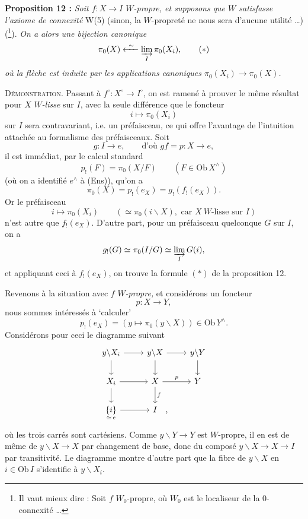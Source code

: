 \documentclass[11pt]{article}
\newcommand{\printedpage}[1]{\marginpar{\footnotesize p.~#1}}
\newcommand{\msp}[1]{\marginpar{\footnotesize [#1]}}
\begin{document}
\textbf{Proposition 12 :} \textit{Soit $f : X \longrightarrow I$ $W$-propre, et supposons que $W$ satisfasse l'axiome de connexité} W(5) (sinon, la $W$-propreté ne nous sera d'aucune utilité \dots) (\footnote[81]{Il vaut mieux dire : Soit $f$ $W_0$-propre, où $W_0$ est le localiseur de la 0-connexité \dots}). \textit{On a alors une bijection canonique}
\[
\pi_0(X) \xleftarrow{\ \sim\ } \varinjlim_{I} \pi_0(X_i), \tag*{$(*)$}
\]
\textit{où la flèche est induite par les applications canoniques $\pi_0(X_i) \longrightarrow \pi_0(X)$.}

\textsc{Démonstration.} Passant à $f^\circ : X^\circ \longrightarrow I^\circ$, on est ramené à prouver le même résultat pour $X$ \textit{$W$-lisse} sur $I$, avec la seule différence que le foncteur
\[
i \longmapsto \pi_0(X_i)
\]
sur $I$ sera contravariant, i.e. un préfaisceau, ce qui offre l'avantage de l'intuition attachée au formalisme des préfaisceaux. Soit
\[
g : I \longrightarrow e, \qquad \text{d'où } gf = p : X \longrightarrow e,
\]
il est immédiat, par le calcul standard
\[
p_!(F) = \pi_0(X/F) \qquad (F \in \mathrm{Ob}\, X^\wedge)
\]
(où on a identifié $e^\wedge$ à (Ens)), qu'on a
\[
\pi_0(X) = p_!(e_X) = g_!(f_!(e_X)).
\]
Or le préfaisceau
\[
i \longmapsto \pi_0(X_i) \qquad (\simeq \pi_0(i\backslash X), \text{ car } X\ W\text{-lisse sur } I)
\]
\msp{page 117}
n'est autre que $f_!(e_X)$. D'autre part, pour un préfaisceau quelconque $G$ sur $I$, on a
\[
g_!(G) \simeq \pi_0(I/G) \simeq \varinjlim_{I} G(i),
\]
et appliquant ceci à $f_!(e_X)$, on trouve la formule $(*)$ de la proposition 12.

Revenons à la situation avec $f$ \textit{$W$-propre,} et considérons un foncteur
\[
p : X \longrightarrow Y,
\]
nous sommes intéressés à ‘calculer’
\[
p_!(e_X) = (y \longmapsto \pi_0(y\backslash X)) \in \mathrm{Ob}\, Y^\wedge.
\]
Considérons pour ceci le diagramme suivant
\printedpage{80}
\[
\begin{tikzcd}
y\backslash X_i \arrow[r] \arrow[d] & y\backslash X \arrow[r] \arrow[d] & y\backslash Y \arrow[d] \\
X_i \arrow[r] \arrow[d] & X \arrow[r, "p"] \arrow[d, "f"] & Y \\
\underset{\simeq\, e}{\{i\}} \arrow[r] & I\rlap{\quad ,} &
\end{tikzcd}
\]
où les trois carrés sont cartésiens. Comme $y\backslash Y \longrightarrow Y$ est $W$-propre, il en est de même de $y\backslash X \longrightarrow X$ par changement de base, donc du composé $y\backslash X \longrightarrow X \longrightarrow I$ par transitivité. Le diagramme montre d'autre part que la fibre de $y\backslash X$ en $i \in \mathrm{Ob}\, I$ s'identifie à $y\backslash X_i$.
\end{document}
